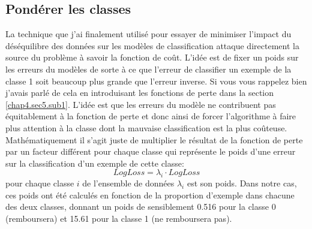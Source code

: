 \subsection{Pondérer les classes}
\label{chap4.sec9.sub2}
La technique que j'ai finalement utilisé pour essayer de minimiser l'impact du déséquilibre des données sur les modèles de classification attaque directement la source du problème à savoir la fonction de coût. L'idée est de fixer un poids sur les erreurs du modèles de sorte à ce que l'erreur de classifier un exemple de la classe 1 soit beaucoup plus grande que l'erreur inverse. Si vous vous rappelez bien j'avais parlé de cela en introduisant les fonctions de perte dans la section \ref{chap4.sec5.sub1}. L'idée est que les erreurs du modèle ne contribuent pas équitablement à la fonction de perte et donc ainsi de forcer l'algorithme à faire plus attention à la classe dont la mauvaise classification est la plus coûteuse. Mathématiquement il s'agit juste de multiplier le résultat de la fonction de perte par un facteur différent pour chaque classe qui représente le poids d'une erreur sur la classification d'un exemple de cette classe:\[LogLoss = \lambda_i \cdot LogLoss\] pour chaque classe \(i\) de l'ensemble de données \(\lambda_i\) est son poids. Dans notre cas, ces poids ont été calculés en fonction de la proportion d'exemple dans chacune des deux classes, donnant un poids de sensiblement 0.516 pour la classe 0 (remboursera) et 15.61 pour la classe 1 (ne remboursera pas).